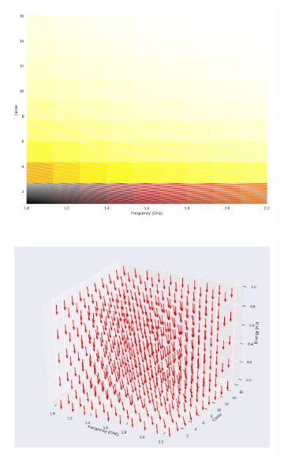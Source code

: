 \begin{figure}[H]

	\centering

	\begin{subfigure}[b]{0.45\textwidth}

		\includegraphics[width=\textwidth]{models/figures/analisys/w1.png}

	\end{subfigure}


	\begin{subfigure}[b]{0.45\textwidth}

		\includegraphics[width=\textwidth]{models/figures/analisys/w1_3d.png}

	\end{subfigure}

\end{figure}

